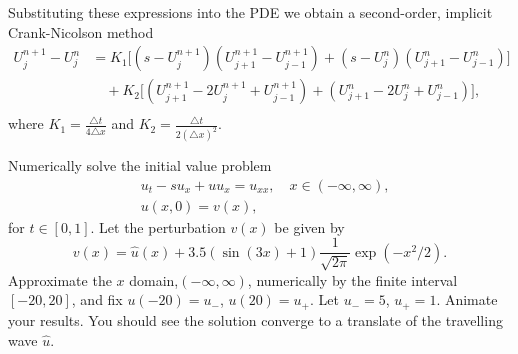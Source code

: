 Substituting these expressions into the PDE we obtain a second-order, implicit Crank-Nicolson method
\begin{align*}
U_j^{n+1} - U_j^n &= K_1 \big[(s - U_j^{n+1})(U_{j+1}^{n+1} - U_{j-1}^{n+1}) 
+ (s - U_j^n) (U_{j+1}^n - U_{j-1}^n) \big] \\
&{ }  \quad
+ K_2 \big[(U_{j+1}^{n+1} - 2U_j^{n+1}+ U_{j-1}^{n+1}) + (U_{j+1}^n -2U_j^n + U_{j-1}^n) \big],\\
&{ }  \quad 
\end{align*}
where $K_1 = \frac{ \triangle t }{4 \triangle x}$ and 
$K_2 = \frac{ \triangle t}{2(\triangle x)^2}$.

\begin{problem}
	Numerically solve the initial value problem
	\begin{align*}
		&{ } u_t -su_x + uu_x = u_{xx}, \quad x \in (-\infty,\infty),\\
		&{ } u(x,0) = v(x),
	\end{align*}
	for $t \in [0,1].$ Let the perturbation $v(x)$ be given by 
	\[
	v(x) = \hat{u}(x) + 3.5(\sin{(3x)} + 1)\frac{1}{\sqrt{2\pi}} \exp{(-x^2/2)}
	.\]
	Approximate the $x$ domain,$(-\infty, \infty)$, numerically by the finite interval $[-20,20]$, and fix $u(-20) = u_-$, $u(20) = u_+$. Let $u_- = 5$, $u_+ = 1$.  Animate your results.  You should see the solution converge to a translate of the travelling wave $\hat{u}$.
\end{problem}





